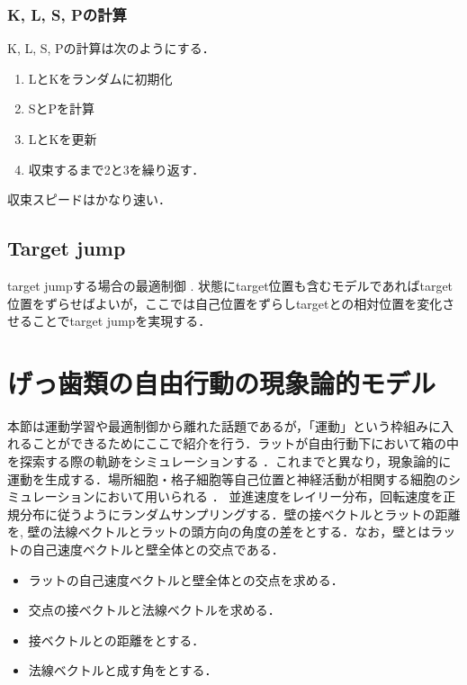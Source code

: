 \subsubsection{K, L, S, Pの計算}
K, L, S, Pの計算は次のようにする．
\begin{enumerate}
\item LとKをランダムに初期化
\item SとPを計算
\item LとKを更新
\item 収束するまで2と3を繰り返す．
\end{enumerate}
収束スピードはかなり速い．
\subsection{Target jump}
target jumpする場合の最適制御 \citep{Li2018-qt}. 状態にtarget位置も含むモデルであればtarget位置をずらせばよいが，ここでは自己位置をずらしtargetとの相対位置を変化させることでtarget jumpを実現する．
\section{げっ歯類の自由行動の現象論的モデル}
本節は運動学習や最適制御から離れた話題であるが，「運動」という枠組みに入れることができるためにここで紹介を行う．ラットが自由行動下において箱の中を探索する際の軌跡をシミュレーションする \citep{Raudies2012-gp}．これまでと異なり，現象論的に運動を生成する．場所細胞・格子細胞等自己位置と神経活動が相関する細胞のシミュレーションにおいて用いられる \citep{George2024-rv}．
並進速度をレイリー分布，回転速度を正規分布に従うようにランダムサンプリングする．壁の接ベクトルとラットの距離を, 壁の法線ベクトルとラットの頭方向の角度の差をとする．なお，壁とはラットの自己速度ベクトルと壁全体との交点である．
\begin{itemize}
\item ラットの自己速度ベクトルと壁全体との交点を求める．
\item 交点の接ベクトルと法線ベクトルを求める．
\item 接ベクトルとの距離をとする．
\item 法線ベクトルと成す角をとする．
\end{itemize}
